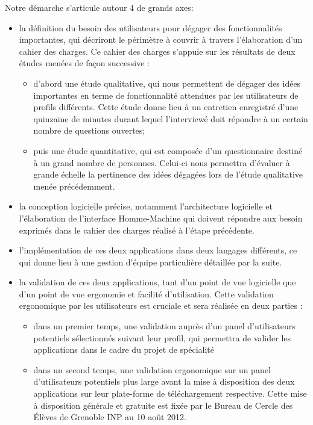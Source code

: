 \documentclass[a4paper,11px]{article}
\begin{document}
\indent Notre démarche s'articule autour 4 de grands axes:
\begin{itemize}
 	\item[\textbullet] la définition du besoin des utilisateurs pour dégager des fonctionnalités importantes, qui décriront le périmètre à couvrir à travers l'élaboration d'un cahier des charges. Ce cahier des charges s'appuie sur les résultats de deux études menées de façon successive : 
	\begin{itemize}
		\item d'abord une étude qualitative, qui nous permettent de dégager des idées importantes en terme de fonctionnalité attendues par les utilisateurs de profils différents. Cette étude donne lieu à un entretien enregistré d'une quinzaine de minutes durant lequel l'interviewé doit répondre à un certain nombre de questions ouvertes;
		\item puis une étude quantitative, qui est composée d'un questionnaire destiné à un grand nombre de personnes. Celui-ci nous permettra d'évaluer à grande échelle la pertinence des idées dégagées lors de l'étude qualitative menée précédemment.
	\end{itemize}
	\item[\textbullet] la conception logicielle précise, notamment l'architecture logicielle et l'élaboration de l'interface Homme-Machine qui doivent répondre aux besoin exprimés dans le cahier des charges réalisé à l'étape précédente.
	\item[\textbullet] l'implémentation de ces deux applications dans deux langages différents, ce qui donne lieu à une gestion d'équipe particulière détaillée par la suite.
	\item[\textbullet] la validation de ces deux applications, tant d'un point de vue logicielle que d'un point de vue ergonomie et facilité d'utilisation. Cette validation ergonomique par les utilisateurs est cruciale et sera réalisée en deux parties :
	\begin{itemize}
		\item dans un premier temps, une validation auprès d'un panel d'utilisateurs potentiels sélectionnés suivant leur profil, qui permettra de valider les applications dans le cadre du projet de spécialité
		\item dans un second temps, une validation ergonomique sur un panel d'utilisateurs potentiels plus large avant la mise à disposition des deux applications sur leur plate-forme de téléchargement respective. Cette mise à disposition générale et gratuite est fixée par le Bureau de Cercle des \'Elèves de Grenoble INP au 10 août 2012.
\\
\\
	\end{itemize}
\end{itemize}
\end{document}
